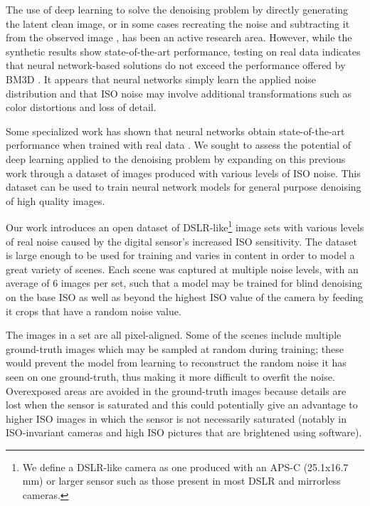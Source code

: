 The use of deep learning to solve the denoising problem by directly generating the latent clean image, or in some cases recreating the noise and subtracting it from the observed image \cite{dncnn}, has been an active research area. However, while the synthetic results show state-of-the-art performance, testing on real data indicates that neural network-based solutions do not exceed the performance offered by \ac{BM3D} \cite{darmstadt}. It appears that neural networks simply learn the applied noise distribution and that ISO noise may involve additional transformations such as color distortions and loss of detail.

Some specialized work has shown that neural networks obtain state-of-the-art performance when trained with real data \cite{learningtoseeinthedark}\cite{microscopynoise}. We sought to assess the potential of deep learning applied to the denoising problem by expanding on this previous work through a dataset of images produced with various levels of ISO noise. This dataset can be used to train neural network models for general purpose denoising of high quality images.

Our work introduces an open dataset of DSLR-like\footnote{\label{largesensornote}We define a DSLR-like camera as one produced with an APS-C (25.1x16.7 mm) or larger sensor such as those present in most \acs{DSLR} and mirrorless cameras.} image sets with various levels of real noise caused by the digital sensor's increased ISO sensitivity. The dataset is large enough to be used for training and varies in content in order to model a great variety of scenes. Each scene was captured at multiple noise levels, with an average of 6 images per set, such that a model may be trained for blind denoising on the base ISO as well as beyond the highest ISO value of the camera by feeding it crops that have a random noise value.

The images in a set are all pixel-aligned. Some of the scenes include multiple ground-truth images which may be sampled at random during training; these would prevent the model from learning to reconstruct the random noise it has seen on one ground-truth, thus making it more difficult to overfit the noise. Overexposed areas are avoided in the ground-truth images because details are lost when the sensor is saturated and this could potentially give an advantage to higher ISO images in which the sensor is not necessarily saturated (notably in ISO-invariant cameras and high ISO pictures that are brightened using software).

